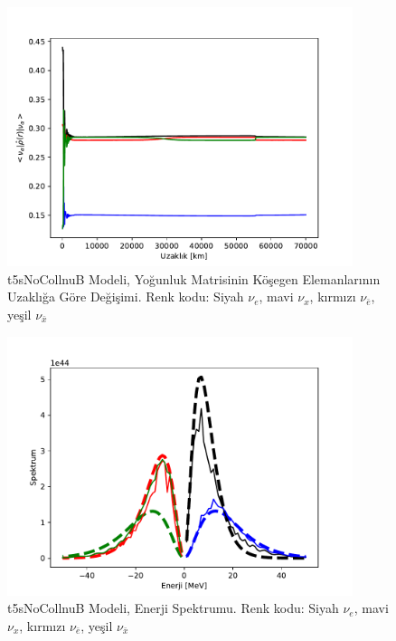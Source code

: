 \newpage
\begin{figure}[hbt!]
    \centering
    \includegraphics[width=0.9\textwidth]{figures/t5sNoCollnuB_distdiag10.pdf}
    \caption[t5sNoCollnuB Modeli, Yoğunluk Matrisinin Köşegen Elemanlarının Uzaklığa Göre Değişimi.]{t5sNoCollnuB Modeli, Yoğunluk Matrisinin Köşegen Elemanlarının Uzaklığa Göre Değişimi. Renk kodu: Siyah $ \nu_{e} $, mavi $ \nu_{x} $, kırmızı $ \nu_{\bar{e}} $, yeşil $ \nu_{\bar{x}} $}
    \label{fig:t5sNoCollnuB_distdiag10}
\end{figure}
\begin{figure}[hbt!]
    \centering
    \includegraphics[width=0.9\textwidth]{figures/t5sNoCollnuB_spectrum.pdf}
    \caption[t5sNoCollnuB Modeli, Enerji Spektrumu.]{t5sNoCollnuB Modeli, Enerji Spektrumu. Renk kodu: Siyah $ \nu_{e} $, mavi $ \nu_{x} $, kırmızı $ \nu_{\bar{e}} $, yeşil $ \nu_{\bar{x}} $}
    \label{fig:t5sNoCollnuB_spectrum}
\end{figure}

